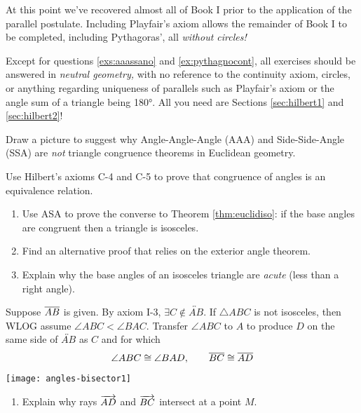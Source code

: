 At this point we've recovered almost all of Book I prior to the application of the parallel postulate. Including Playfair's axiom allows the remainder of Book I to be completed, including Pythagoras', all \emph{without circles!}

\begin{exercises}
Except for questions \ref*{exs:aaassano} and \ref*{ex:pythagnocont}, all exercises should be answered in \emph{neutral geometry,} with no reference to the continuity axiom, circles, or anything regarding uniqueness of parallels such as Playfair's axiom or the angle sum of a triangle being \ang{180}. All you need are Sections \ref*{sec:hilbert1} and \ref*{sec:hilbert2}!
\begin{enumerate}\itemsep3pt
  \item\label{exs:aaassano} Draw a picture to suggest why Angle-Angle-Angle (AAA) and Side-Side-Angle (SSA) are \emph{not} triangle congruence theorems in Euclidean geometry.
  
  
  \item Use Hilbert's axioms C-4 and C-5 to prove that congruence of angles is an equivalence relation.
  
  
  \item\label{exs:isoconverse}\begin{enumerate}
    \item Use ASA to prove the converse to Theorem \ref{thm:euclidiso}: if the base angles are congruent then a triangle is isosceles.
    \item Find an alternative proof that relies on the exterior angle theorem.
    \item Explain why the base angles of an isosceles triangle are \emph{acute} (less than a right angle).
  \end{enumerate}
  
  
  \begin{minipage}[t]{0.68\linewidth}\vspace{0pt}
  \item Suppose $\overline{AB}$ is given. By axiom I-3, $\exists C\not\in\overleftrightarrow{AB}$.\smallbreak
	If $\triangle ABC$ is not isosceles, then WLOG assume $\angle ABC<\angle BAC$.\smallbreak
	Transfer $\angle ABC$ to $A$ to produce $D$ on the same side of $\overleftrightarrow{AB}$ as $C$ and for which
	\[\angle ABC\cong\angle BAD,\qquad \overline{BC}\cong\overline{AD}\]
	\end{minipage}\begin{minipage}[t]{0.32\linewidth}\vspace{0pt}
		\flushright\texttt{[image: angles-bisector1]}
	\end{minipage}\vspace{-20pt}
	\begin{enumerate}
	  \item Explain why rays $\overrightarrow{AD}$ and $\overrightarrow{BC}$ intersect at a point $M$.
	  

\end{enumerate}
\end{enumerate}
\end{exercises}
